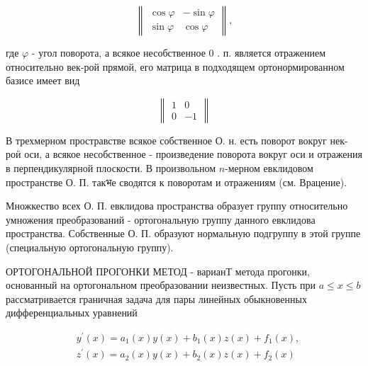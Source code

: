 \documentclass[10pt]{article}
\begin{document}
\[

\left\|\begin{array}{lr}

\cos \varphi & -\sin \varphi \\

\sin \varphi & \cos \varphi

\end{array}\right\|,

\]



где $\varphi$ - угол поворота, а всякое несобственное 0 . п. является отражением относительно век-рой прямой, его матрица в подходящем ортонормированном базисе имеет вид



\[

\left\|\begin{array}{rr}

1 & 0 \\

0 & -1

\end{array}\right\|

\]



В трехмерном простравстве всякое собственное О. н. есть поворот вокруг нек-роӥ оси, а всякое несобственное - произведение поворота вокруг оси и отражения в перпендикулярной плоскости. В произвольном $n$-мерном евклидовом пространстве О. П. такभе сводятся к поворотам и отражениям (см. Врацение).



Множкество всех О. П. евклидова пространства образует группу относительно умножения преобразований - ортогональную группу данного евклидова пространства. Собственные О. П. образуют нормальную подгруппу в этой группе (специальную ортогональную группу).



ОРТОГОНАЛЬНОЙ ПРОГОНКИ МЕТОД - варианТ метода прогонки, основанный на ортогональном преобразовании неизвестных. Пусть при $a \leqslant x \leqslant b$ рассматривается граничная задача для пары линейных обыкновенных дифференциальных уравнений



\[

\begin{aligned}

& y^{\prime}(x)=a_{1}(x) y(x)+b_{1}(x) z(x)+f_{1}(x), \\

& z^{\prime}(x)=a_{2}(x) y(x)+b_{2}(x) z(x)+f_{2}(x)

\end{aligned}

\]
\end{document}
